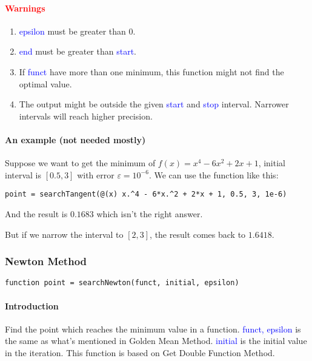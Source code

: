 \documentclass{article}
\begin{document}
\paragraph{\textcolor{red}{Warnings}}
\begin{enumerate}
    \item \textcolor{blue}{epsilon} must be greater than $0$. 
    \item \textcolor{blue}{end} must be greater than \textcolor{blue}{start}.
    \item If \textcolor{blue}{funct} have more than one minimum, this function might not find the optimal value.
    \item The output might be outside the given \textcolor{blue}{start} and \textcolor{blue}{stop} interval. Narrower intervals will reach higher precision.
\end{enumerate}

\paragraph{An example (not needed mostly)}
Suppose we want to get the minimum of $f(x) = x^4 - 6x^2 + 2x + 1$, initial interval is $[0.5, 3]$ with error $\varepsilon = 10^{-6}$. We can use the function like this:
\begin{verbatim}
point = searchTangent(@(x) x.^4 - 6*x.^2 + 2*x + 1, 0.5, 3, 1e-6)
\end{verbatim}

And the result is $0.1683$ which isn't the right answer.

But if we narrow the interval to $[2, 3]$, the result comes back to $1.6418$.

\subsubsection{Newton Method}
\begin{verbatim}
function point = searchNewton(funct, initial, epsilon)
\end{verbatim}

\paragraph{Introduction}
Find the point which reaches the minimum value in a function. \textcolor{blue}{funct, epsilon} is the same as what's mentioned in Golden Mean Method. \textcolor{blue}{initial} is the initial value in the iteration. This function is based on Get Double Function Method.
\end{document}
